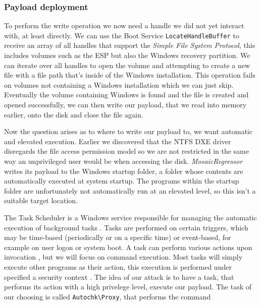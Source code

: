 \subsubsection{Payload deployment}

To perform the write operation we now need a handle we did not yet interact with, at least directly. We can use the Boot Service \lstinline{LocateHandleBuffer} to receive an array of all handles that support the \emph{Simple File System Protocol}, this includes volumes such as the \ac{ESP} but also the Windows recovery partition. We can iterate over all handles to open the volume and attempting to create a new file with a file path that's inside of the Windows installation. This operation fails on volumes not containing a Windows installation which we can just skip. Eventually the volume containing Windows is found and the file is created and opened successfully, we can then write our payload, that we read into memory earlier, onto the disk and close the file again.

Now the question arises as to where to write our payload to, we want automatic and elevated execution. Earlier we discovered that the \ac{NTFS} \ac{DXE} driver disregards the file access permission model  so we are not restricted in the same way an unprivileged user would be when accessing the disk. \emph{MosaicRegressor} writes its payload to the Windows startup folder, a folder whose contents are automatically executed at system startup. The programs within the startup folder are unfortunately not automatically run at an elevated level, so this isn't a suitable target location.


The Task Scheduler is a Windows service responsible for managing the automatic execution of background tasks \cite[10. The Task Scheduler]{windows-internals-7-part2}. Tasks are performed on certain triggers, which may be time-based (periodically or on a specific time) or event-based, for example on user logon or system boot\cite{microsoft-task-scheduler-triggers}. A task can perform various actions upon invocation \cite{microsoft-task-scheduler-actions}, but we will focus on command execution. Most tasks will simply execute other programs as their action, this execution is performed under specified a security context \cite{microsoft-task-scheduler-security-contexts}. The idea of our attack is to have a task, that performs its action with a high privelege level, execute our payload. The task of our choosing is called \lstinline{Autochk\Proxy}, that performs the command

